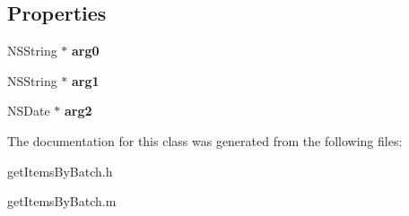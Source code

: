 \subsection*{Properties}
\begin{DoxyCompactItemize}
\item 
\hypertarget{interfaceget_items_by_batch_ae9d3c70dc39116094d1ea5c0a76428da}{}N\+S\+String $\ast$ {\bfseries arg0}\label{interfaceget_items_by_batch_ae9d3c70dc39116094d1ea5c0a76428da}

\item 
\hypertarget{interfaceget_items_by_batch_a0e7d21d5baa72db30161d907ddf4fea7}{}N\+S\+String $\ast$ {\bfseries arg1}\label{interfaceget_items_by_batch_a0e7d21d5baa72db30161d907ddf4fea7}

\item 
\hypertarget{interfaceget_items_by_batch_a512a93bd1ef137064cccfbab4b43c389}{}N\+S\+Date $\ast$ {\bfseries arg2}\label{interfaceget_items_by_batch_a512a93bd1ef137064cccfbab4b43c389}

\end{DoxyCompactItemize}


The documentation for this class was generated from the following files\+:\begin{DoxyCompactItemize}
\item 
get\+Items\+By\+Batch.\+h\item 
get\+Items\+By\+Batch.\+m\end{DoxyCompactItemize}
